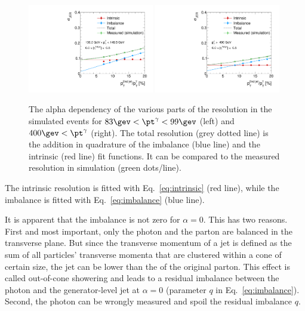 \begin{figure}[!b]
 \centering
    \includegraphics[width=0.49\textwidth]{figures/resolution/methodology/JER_for_1_eta_bin_5_pTGamma_bin_wo_data_PFCHS_RMS99_mc.pdf} 
    \includegraphics[width=0.49\textwidth]{figures/resolution/methodology/JER_for_1_eta_bin_12_pTGamma_bin_wo_data_PFCHS_RMS99_mc.pdf} 
  \caption{The alpha dependency of the various parts of the resolution in the simulated events for $83 \gev < \pt^{\gamma} < 99 \gev $ (left) and $400 \gev < \pt^{\gamma}$ (right). 
           The total resolution (grey dotted line) is the addition in quadrature of the imbalance (blue line) and the intrinsic (red line) fit functions. 
           It can be compared to the measured resolution in simulation (green dots/line).}  
 \label{fig:AlphaDependenceOfResolutions}
\end{figure}
The intrinsic resolution is fitted with Eq.~\eqref{eq:intrinsic} (red line), while the imbalance is fitted with Eq.~\eqref{eq:imbalance} (blue line).

It is apparent that the imbalance is not zero for $\alpha=0$. 
This has two reasons.
First and most important, only the photon and the parton are balanced in the transverse plane.
But since the transverse momentum of a jet is defined as the sum of all particles' transverse momenta that are clustered within a cone of certain size, the jet \pt can be lower than the \pt of the original parton.
This effect is called out-of-cone showering and leads to a residual imbalance between the photon \pt and the generator-level jet \pt at $\alpha=0$ (parameter $q$ in Eq.~\eqref{eq:imbalance}).
Second, the photon \pt can be wrongly measured and spoil the residual imbalance $q$. 

